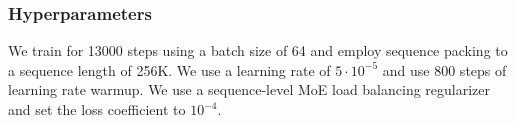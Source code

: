 \subsubsection{Hyperparameters}
We train for 13000 steps using a batch size of 64 and employ sequence packing to a sequence length of 256K. We use a learning rate of $5\cdot 10^{-5}$ and use 800 steps of learning rate warmup. We use a sequence-level MoE load balancing regularizer and set the loss coefficient to $10^{-4}$.



% 




